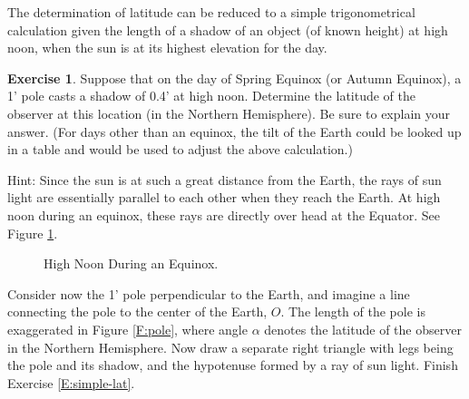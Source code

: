\documentclass[12pt]{article}
\theoremstyle{definition}
\newtheorem{exercise}{Exercise}[section]
\begin{document}
The determination of latitude can be reduced to a simple
trigonometrical calculation given the length of a shadow of an object
(of known height) at high noon, when the sun is at its highest
elevation for the day.  
\begin{exercise}  \label{E:simple-lat}
 Suppose that on the day of Spring Equinox (or Autumn Equinox), a 1'
 pole casts a shadow of 0.4' at high noon.  Determine the latitude of
 the observer at this location (in the Northern Hemisphere).  Be sure to explain your answer.  
(For days other than an equinox, the
 tilt of the Earth could be looked up in a table and would be used to
 adjust the above calculation.)
\end{exercise}      

Hint:  Since the sun is at such a great distance from the Earth, the rays of sun light
are essentially parallel to each other when they reach the Earth.  At high noon 
during an equinox, these rays are directly over head at the Equator.  See Figure 
\ref{F:noon-equinox}.  
\bigskip

\begin{figure}[htb] 
\begin{center}
\end{center}
\caption{High Noon During an Equinox.}  \label{F:noon-equinox}
\end{figure}

Consider now the 1' pole perpendicular to the Earth, and imagine a line connecting 
the pole to the center of the Earth, $O$.  The length of the pole is exaggerated 
in Figure \ref{F:pole}, where angle $\alpha$ denotes the latitude of the observer in the
Northern Hemisphere.  Now
draw a separate right triangle with legs being the pole and its shadow, and the 
hypotenuse formed by a ray of sun light.  Finish Exercise \eqref{E:simple-lat}.
\bigskip
\end{document}
